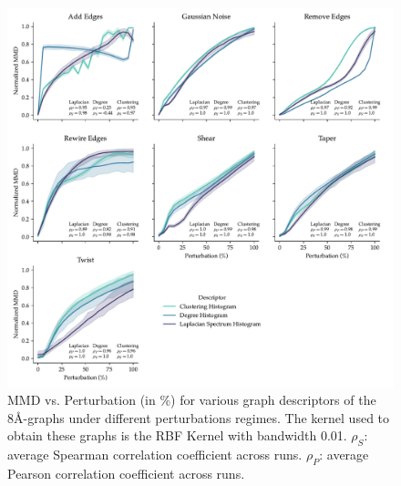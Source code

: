 \begin{figure}
  \centering
  \includegraphics[width=\textwidth]{./figures/results/res_1_1.pdf}
  \caption{MMD vs. Perturbation (in \%) for various graph descriptors of the 8\si{\angstrom}-graphs under different perturbations regimes. The kernel
    used to obtain these graphs is the RBF Kernel with bandwidth 0.01.
    $\rho_{S}$: average Spearman correlation coefficient across runs.
    $\rho_{P}$: average Pearson correlation coefficient across runs.}
  \label{fig:mmd_consistent_eps}
\end{figure}


